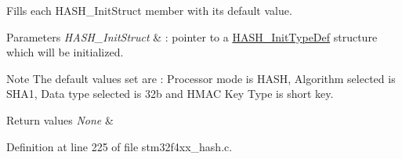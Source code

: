 Fills each H\-A\-S\-H\-\_\-\-Init\-Struct member with its default value. 


\begin{DoxyParams}{Parameters}
{\em H\-A\-S\-H\-\_\-\-Init\-Struct} & \-: pointer to a \hyperlink{struct_h_a_s_h___init_type_def}{H\-A\-S\-H\-\_\-\-Init\-Type\-Def} structure which will be initialized. \\
\hline
\end{DoxyParams}
\begin{DoxyNote}{Note}
The default values set are \-: Processor mode is H\-A\-S\-H, Algorithm selected is S\-H\-A1, Data type selected is 32b and H\-M\-A\-C Key Type is short key. 
\end{DoxyNote}

\begin{DoxyRetVals}{Return values}
{\em None} & \\
\hline
\end{DoxyRetVals}


Definition at line 225 of file stm32f4xx\-\_\-hash.\-c.

